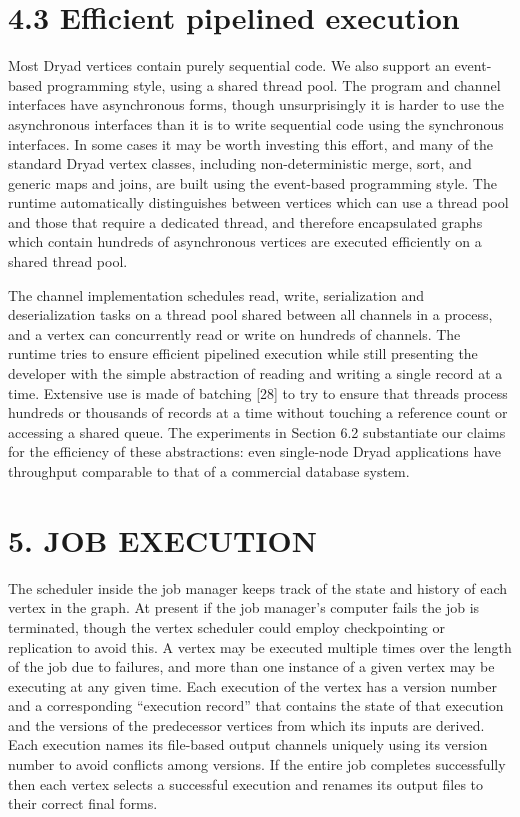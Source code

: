 \documentclass[
]{article}
\begin{document}
\section{4.3 Efficient pipelined
execution}\label{efficient-pipelined-execution}

Most Dryad vertices contain purely sequential code. We also support an
event-based programming style, using a shared thread pool. The program
and channel interfaces have asynchronous forms, though unsurprisingly it
is harder to use the asynchronous interfaces than it is to write
sequential code using the synchronous interfaces. In some cases it may
be worth investing this effort, and many of the standard Dryad vertex
classes, including non-deterministic merge, sort, and generic maps and
joins, are built using the event-based programming style. The runtime
automatically distinguishes between vertices which can use a thread pool
and those that require a dedicated thread, and therefore encapsulated
graphs which contain hundreds of asynchronous vertices are executed
efficiently on a shared thread pool.

The channel implementation schedules read, write, serialization and
deserialization tasks on a thread pool shared between all channels in a
process, and a vertex can concurrently read or write on hundreds of
channels. The runtime tries to ensure efficient pipelined execution
while still presenting the developer with the simple abstraction of
reading and writing a single record at a time. Extensive use is made of
batching {[}28{]} to try to ensure that threads process hundreds or
thousands of records at a time without touching a reference count or
accessing a shared queue. The experiments in Section 6.2 substantiate
our claims for the efficiency of these abstractions: even single-node
Dryad applications have throughput comparable to that of a commercial
database system.

\section{5. JOB EXECUTION}\label{job-execution}

The scheduler inside the job manager keeps track of the state and
history of each vertex in the graph. At present if the job manager's
computer fails the job is terminated, though the vertex scheduler could
employ checkpointing or replication to avoid this. A vertex may be
executed multiple times over the length of the job due to failures, and
more than one instance of a given vertex may be executing at any given
time. Each execution of the vertex has a version number and a
corresponding ``execution record'' that contains the state of that
execution and the versions of the predecessor vertices from which its
inputs are derived. Each execution names its file-based output channels
uniquely using its version number to avoid conflicts among versions. If
the entire job completes successfully then each vertex selects a
successful execution and renames its output files to their correct final
forms.
\end{document}
